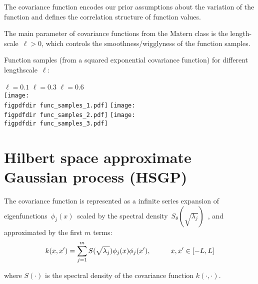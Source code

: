 \documentclass[portrait,a1,final]{a0poster} %
\let\tempone\itemize
\let\temptwo\enditemize
\renewenvironment{itemize}{\tempone\addtolength{\itemsep}{-0.3\baselineskip}}{\temptwo}
\def\figpdfdir{fig/} %
\begin{document}
\begin{minipage}{1\linewidth}
\begin{minipage}[t]{0.48\linewidth}
\begin{itemize}
\item The covariance function encodes our prior assumptions about the variation of the function and defines the {\color{navyblue} correlation structure} of function values.

\item The main parameter of covariance functions from the Matern class is the {\color{navyblue} length-scale}\, $\ell > 0$, which controls the {\color{navyblue} smoothness/wigglyness} of the function samples.

\item Function samples {\scriptsize(from a squared exponential covariance function)} for different lengthscale\, $\ell$:\: 

\hspace{45mm} $\ell=0.1$ \hspace{63mm} $\ell=0.3$ \hspace{64mm} $\ell=0.6$\\
\texttt{[image: \\figpdfdir func\_samples\_1.pdf]}
\texttt{[image: \\figpdfdir func\_samples\_2.pdf]}
\texttt{[image: \\figpdfdir func\_samples\_3.pdf]}

\end{itemize}

\vspace{-0.6cm}
\section{Hilbert space approximate Gaussian process (HSGP)}
\vspace{-0.2cm}

\begin{itemize}\setlength\itemsep{3mm}

\item The covariance function is represented as a {\color{navyblue} infinite series expansion} of eigenfunctions\, $\phi_j(x)$\, scaled by the spectral density\, $S_{\theta}(\sqrt{\lambda_j})$\, {\color{darkgray} \citep{solin2018hilbert}}, and {\color{navyblue} approximated by the first $m$ terms}:
%
\begin{align*}
k(x,x') = \sum_{j=1}^m S(\sqrt{\lambda_j}) \phi_j(x) \phi_j(x'), \hspace{10mm} x,x' \in [-L,L]
\end{align*} 

\item where $S(\cdot)$ is the {\color{navyblue}spectral density} of the covariance function $k(\cdot,\cdot)$.


\end{itemize}
\end{minipage}
\end{minipage}
\end{document}
